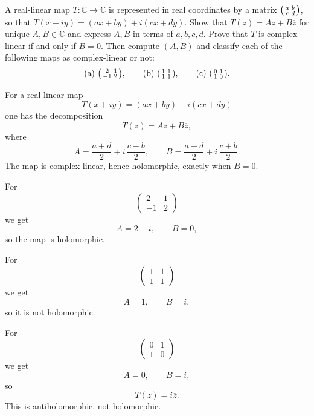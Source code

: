\begin{problem}[CP-IV-0017]
\label{prob:cp-iv-0017}
A real-linear map $T:\mathbb C\to\mathbb C$ is represented in real coordinates by a matrix
$\begin{psmallmatrix}a&b\\c&d\end{psmallmatrix}$, so that
$T(x+iy)=(ax+by)+i(cx+dy)$.
Show that $T(z)=Az+B\overline z$ for unique $A,B\in\mathbb C$ and express $A,B$
in terms of $a,b,c,d$. Prove that $T$ is complex-linear if and only if $B=0$.
Then compute $(A,B)$ and classify each of the following maps as complex-linear or not:
\[
\text{(a) }\begin{psmallmatrix}2&1\\-1&2\end{psmallmatrix},\qquad
\text{(b) }\begin{psmallmatrix}1&1\\1&1\end{psmallmatrix},\qquad
\text{(c) }\begin{psmallmatrix}0&1\\1&0\end{psmallmatrix}.
\]
\end{problem}

\begin{solution}
For a real-linear map
\[
T(x+iy)=(ax+by)+i(cx+dy)
\]
one has the decomposition
\[
T(z)=Az+B\overline z,
\]
where
\[
A=\frac{a+d}{2}+i\,\frac{c-b}{2},
\qquad
B=\frac{a-d}{2}+i\,\frac{c+b}{2}.
\]
The map is complex-linear, hence holomorphic, exactly when \(B=0\).

For
\[
\begin{pmatrix}2&1\\-1&2\end{pmatrix}
\]
we get
\[
A=2-i,\qquad B=0,
\]
so the map is holomorphic.

For
\[
\begin{pmatrix}1&1\\1&1\end{pmatrix}
\]
we get
\[
A=1,\qquad B=i,
\]
so it is not holomorphic.

For
\[
\begin{pmatrix}0&1\\1&0\end{pmatrix}
\]
we get
\[
A=0,\qquad B=i,
\]
so
\[
T(z)=i\overline z.
\]
This is antiholomorphic, not holomorphic.
\end{solution}


